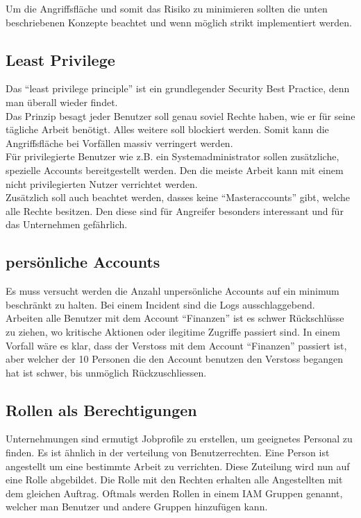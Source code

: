 Um die Angriffsfläche und somit das Risiko zu minimieren sollten die unten beschriebenen Konzepte beachtet und wenn möglich strikt implementiert werden.

\subsection{Least Privilege}
Das ``least privilege principle'' ist ein grundlegender Security Best Practice, denn man überall wieder findet.\\

Das Prinzip besagt jeder Benutzer soll genau soviel Rechte haben, wie er für seine tägliche Arbeit benötigt. Alles weitere soll blockiert werden.
Somit kann die Angriffsfläche bei Vorfällen massiv verringert werden.\\

Für privilegierte Benutzer wie z.B. ein Systemadministrator sollen zusätzliche, spezielle Accounts bereitgestellt werden.
Den die meiste Arbeit kann mit einem nicht privilegierten Nutzer verrichtet werden.\\

Zusätzlich soll auch beachtet werden, dasses keine ``Masteraccounts'' gibt, welche alle Rechte besitzen.
Den diese sind für Angreifer besonders interessant und für das Unternehmen gefährlich.


\subsection{persönliche Accounts}
Es muss versucht werden die Anzahl unpersönliche Accounts auf ein minimum beschränkt zu halten.
Bei einem Incident sind die Logs ausschlaggebend.\\

Arbeiten alle Benutzer mit dem Account ``Finanzen'' ist es schwer Rückschlüsse zu ziehen, wo kritische Aktionen oder ilegitime Zugriffe passiert sind.
In einem Vorfall wäre es klar, dass der Verstoss mit dem Account ``Finanzen'' passiert ist, aber welcher der 10 Personen die den Account benutzen den Verstoss begangen hat ist schwer, bis unmöglich Rückzuschliessen.

\subsection{Rollen als Berechtigungen}
Unternehmungen sind ermutigt Jobprofile zu erstellen, um geeignetes Personal zu finden.
Es ist ähnlich in der verteilung von Benutzerrechten.
Eine Person ist angestellt um eine bestimmte Arbeit zu verrichten.
Diese Zuteilung wird nun auf eine Rolle abgebildet.
Die Rolle mit den Rechten erhalten alle Angestellten mit dem gleichen Auftrag.
Oftmals werden Rollen in einem IAM Gruppen genannt, welcher man Benutzer und andere Gruppen hinzufügen kann.\\

